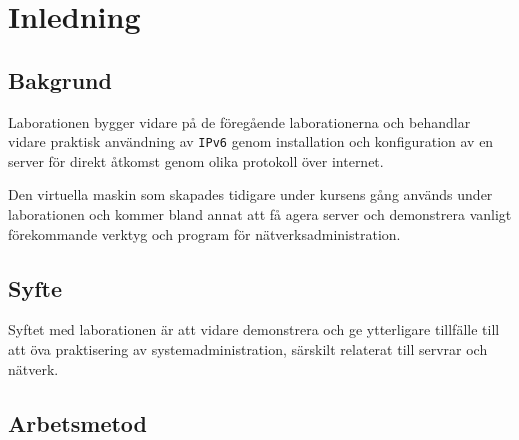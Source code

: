 %
%
%


\section{Inledning}


\subsection{Bakgrund}
Laborationen bygger vidare på de föregående laborationerna och behandlar vidare
praktisk användning av \texttt{IPv6} genom installation och konfiguration av
en server för direkt åtkomst genom olika protokoll över internet.

Den virtuella maskin som skapades tidigare under kursens gång används under
laborationen och kommer bland annat att få agera server och demonstrera vanligt
förekommande verktyg och program för nätverksadministration.

\subsection{Syfte}
Syftet med laborationen är att vidare demonstrera och ge ytterligare tillfälle
till att öva praktisering av systemadministration, särskilt relaterat till
servrar och nätverk.

\subsection{Arbetsmetod}


